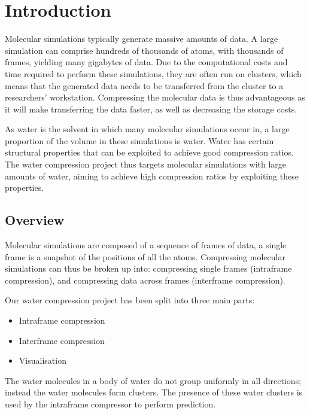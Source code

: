 \graphicspath{{./introduction/}}

\chapter{Introduction}
\label{cha:introduction}

Molecular simulations typically generate massive amounts of data. A large
simulation can comprise hundreds of thousands of atoms, with thousands of
frames, yielding many gigabytes of data. Due to the computational costs and
time required to perform these simulations, they are often run on clusters,
which means that the generated data needs to be transferred from the cluster to
a researchers' workstation. Compressing the molecular data is thus advantageous
as it will make transferring the data faster, as well as decreasing the storage
costs.

As water is the solvent in which many molecular simulations occur in, a large
proportion of the volume in these simulations is water. Water has certain
structural properties that can be exploited to achieve good compression ratios.
The water compression project thus targets molecular simulations with large
amounts of water, aiming to achieve high compression ratios by exploiting these
properties.

\section{Overview}
\label{sec:introduction_overview}

Molecular simulations are composed of a sequence of frames of data, a single
frame is a snapshot of the positions of all the atoms. Compressing molecular
simulations can thus be broken up into: compressing single frames (intraframe
compression), and compressing data across frames (interframe compression).

Our water compression project has been split into three main parts:

\begin{itemize}
  \item Intraframe compression
  \item Interframe compression
  \item Visualisation
\end{itemize}

The water molecules in a body of water do not group uniformly in all
directions; instead the water molecules form clusters. The presence of these
water clusters is used by the intraframe compressor to perform prediction.

